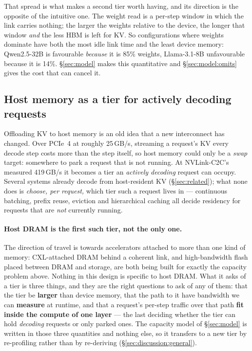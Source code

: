 That spread is what makes a second tier worth having, and its direction is the
opposite of the intuitive one. The weight read is a per-step window in which the
link carries nothing; the larger the weights relative to the device, the longer
that window \emph{and} the less HBM is left for KV. So configurations where
weights dominate have both the most idle link time and the least device memory:
Qwen2.5-32B is favourable \emph{because} it is 85\% weights, Llama-3.1-8B
unfavourable because it is 14\%. \S\ref{sec:model} makes this quantitative and
\S\ref{sec:model:omits} gives the cost that can cancel it.

\subsection{Host memory as a tier for actively decoding requests}

Offloading KV to host memory is an old idea that a new interconnect has changed.
Over PCIe~4 at roughly 25\,GB/s, streaming a request's KV every decode step costs
more than the step itself, so host memory could only be a \emph{swap} target:
somewhere to park a request that is not running. At NVLink-C2C's measured
419\,GB/s it becomes a tier an \emph{actively decoding} request can occupy.
Several systems already decode from host-resident KV (\S\ref{sec:related}); what
none does is \emph{choose, per request,} which tier such a request lives in ---
continuous batching, prefix reuse, eviction and hierarchical caching all decide
residency for requests that are \emph{not} currently running.

\paragraph{Host DRAM is the first such tier, not the only one.} The direction of
travel is towards accelerators attached to more than one kind of memory:
CXL-attached DRAM behind a coherent link, and high-bandwidth flash placed between
DRAM and storage, are both being built for exactly the capacity problem above.
Nothing in this design is specific to host DRAM. What it asks of a tier is three
things, and they are the right questions to ask of any of them: that the tier be
\textbf{larger} than device memory, that the path to it have bandwidth we can
\textbf{measure} at runtime, and that a request's per-step traffic over that path
\textbf{fit inside the compute of one layer} --- the last deciding whether the
tier can hold \emph{decoding} requests or only parked ones. The capacity model of
\S\ref{sec:model} is written in those three quantities and nothing else, so it
transfers to a new tier by re-profiling rather than by re-deriving
(\S\ref{sec:discussion:general}).

